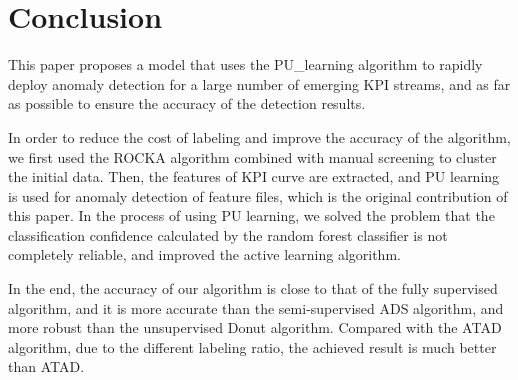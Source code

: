 \section{Conclusion}
\label{sec:conclusion}
This paper proposes a model that uses the PU\_learning algorithm to rapidly deploy anomaly detection for a large number of emerging KPI streams, and as far as possible to ensure the accuracy of the detection results.

In order to reduce the cost of labeling and improve the accuracy of the algorithm, we first used the ROCKA algorithm combined with manual screening to cluster the initial data. Then, the features of KPI curve are extracted, and PU learning is used for anomaly detection of feature files, which is the original contribution of this paper. In the process of using PU learning, we solved the problem that the classification confidence calculated by the random forest classifier is not completely reliable, and improved the active learning algorithm.

In the end, the accuracy of our algorithm is close to that of the fully supervised algorithm, and it is more accurate than the semi-supervised ADS algorithm, and more robust than the unsupervised Donut algorithm. Compared with the ATAD algorithm, due to the different labeling ratio, the achieved result is much better than ATAD.

